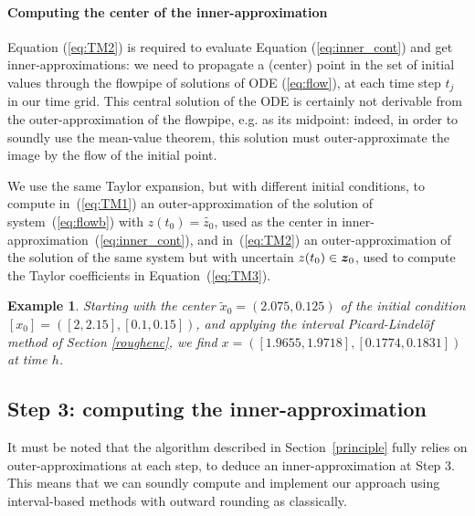\documentclass{sig-alternate-05-2015}
\newcommand\ForAuthors[1]%
 {\par\smallskip                     %
  \begin{center}%
   \fbox%
   {\parbox{0.9\linewidth}%
    {\raggedright\sc--- #1}%
   }%
  \end{center}%
  \par\smallskip                     %
 }
\newtheorem{example}{Example}
\def\intvl#1{\mbox{$[ #1 ]$}}
\newtheorem{remark}{Remark}
\begin{document}
\paragraph{Computing the center of the inner-approximation}

Equation (\ref{eq:TM2}) is required to evaluate Equation (\ref{eq:inner_cont}) and get inner-approxima\-tions: we need to propagate a (center) point in the set of initial values 
through the flowpipe of solutions of ODE (\ref{eq:flow}), at each time step $t_j$ in our time grid. This central solution of the ODE is certainly not derivable from the 
outer-approximation of the flowpipe, e.g. as its midpoint: indeed, in order to soundly use the mean-value theorem, this solution must outer-approximate the image by the flow of
the initial point. 
 
We use the same Taylor expansion, but with different initial conditions, to compute in~(\ref{eq:TM1}) an outer-approximation of the solution of system~(\ref{eq:flowb}) 
with $z(t_0)=\tilde{z_0}$, used as the center in inner-approximation~(\ref{eq:inner_cont}), and  in~(\ref{eq:TM2}) an outer-approximation of the solution of the 
same system but with uncertain $z(t_0) \in \z_0$, used to compute the Taylor coefficients in Equation~(\ref{eq:TM3}). %

\begin{example}
\label{runningcenter}
Starting with the center $\tilde{x}_0=(2.075,0.125)$ of the initial condition $\intvl{x_0}=\left(
\left[2,2.15\right],\left[0.1,0.15\right]\right)$, and applying the interval Picard-Lindel\"of method
of Section \ref{roughenc}, 
we find $x=\left(\left[1.9655, 1.9718\right], 
\left[0.1774, 0.1831\right]
\right)$ at time $h$.  
\end{example}


\subsection{Step 3: computing the inner-approximation}
\label{practicalissues}

It must be noted that the algorithm described in Section~\ref{principle} fully relies on outer-approximations at each step, 
to deduce an inner-approximation at Step 3. This means that we can soundly compute and implement our approach using interval-based 
methods with outward rounding as classically. 
\end{document}
